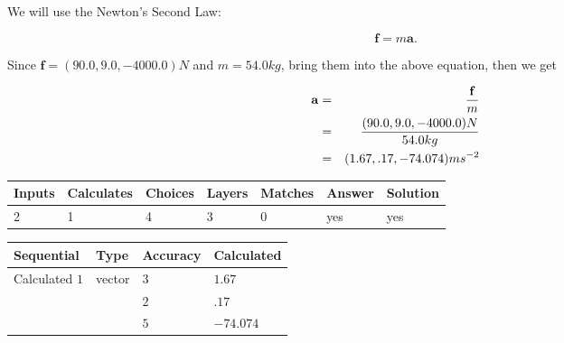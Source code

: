 \documentclass[12pt]{article}
\begin{document}
 
 
 
 
\noindent{}
 
 

We will use the Newton's Second Law:
 
\[
\mathbf{f}=m\mathbf{a}.
\]
 
Since $\mathbf{f}= %
(90.0 , 9.0 , -4000.0) N$
and $m= %
54.0kg$, bring them into the above equation, then we get
 
\begin{eqnarray*}
\mathbf{a}&=&\frac{\mathbf{f}}m  \\
&=&\frac{ %
(90.0 , 9.0 , -4000.0) N}{ %
54.0kg}  \\
&=& %
(1.67 , .17 , -74.074) ms^{-2}
\end{eqnarray*}
 
 
 
\noindent{}
 
 

 
 
\vspace{0.3in}
   
   
   
   
\noindent\begin{tabular}{|l|l|l|l|l|l|l|}
 \hline
Inputs & Calculates & Choices & Layers & Matches & Answer & Solution \\ \hline
           2 & 
           1 & 
           4
  & 
           3 & 
           0 & 
  yes & 
  yes 
  \\ \hline
 \end{tabular}
   
   
   
   
\noindent{}
   
   
  
  
\noindent\begin{tabular}{|l|l|l|l|}
\hline
 Sequential & Type & Accuracy & Calculated \\ 
\hline
 
 
  Calculated $           1$ & vector &  
  $           3 $ 
 &  $ 1.67 $ 
 \\    
  & & 
  $           2 $ 
 &  $ .17 $ 
 \\    
  & & 
  $           5 $ 
 &  $ -74.074 $ 
 \\  \hline  
 \end{tabular}
   
\end{document}
